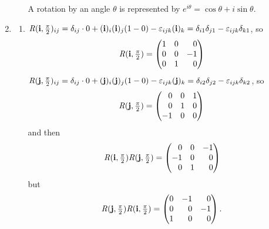 \documentclass[fleqn,a4paper,11pt]{article}
\begin{document}
\begin{enumerate}[label=\textbf{\arabic*.}]
\begin{enumerate}[label=(\alph*)]
      A rotation by an angle \(\theta\) is represented by
      \(e^{i\theta} = \cos \theta + i \sin \theta\).
    \end{enumerate}
   \item
    \begin{enumerate}[label=(\alph*)]
     \item
      \(\mathit{R}(\mathrm{\mathbf{i}}, \frac \pi 2)_{ij}
        = \delta_{ij} \cdot 0 + (\mathrm{\mathbf{i}})_i (\mathrm{\mathbf{i}})_j (1 - 0)
           - \varepsilon_{ijk} (\mathrm{\mathbf{i}})_k
        = \delta_{i1} \delta_{j1} - \varepsilon_{ijk} \delta_{k1}\), so
      \begin{equation*}
       \mat R(\vec i, \tfrac \pi 2)
        =
        \begin{pmatrix*}[r]
         1 & 0 & 0 \\
         0 & 0 & -1 \\
         0 & 1 & 0
        \end{pmatrix*}
      \end{equation*}
      \(\mathit{R}(\mathrm{\mathbf{j}}, \frac \pi 2)_{ij}
        = \delta_{ij} \cdot 0 + (\mathrm{\mathbf{j}})_i (\mathrm{\mathbf{j}})_j (1 - 0)
           - \varepsilon_{ijk} (\mathrm{\mathbf{j}})_k
        = \delta_{i2} \delta_{j2} - \varepsilon_{ijk} \delta_{k2}\), so
      \begin{equation*}
       \mat R(\vec j, \tfrac \pi 2)
        =
        \begin{pmatrix*}[r]
         0 & 0 & 1 \\
         0 & 1 & 0 \\
         -1 & 0 & 0
        \end{pmatrix*}
      \end{equation*}
      and then
      \begin{equation*}
       \mat R(\vec i, \tfrac \pi 2)\mat R(\vec j, \tfrac \pi 2)
        =
        \begin{pmatrix*}[r]
         0 & 0 & -1 \\
         -1 & 0 & 0 \\
         0 & 1 & 0
        \end{pmatrix*}
      \end{equation*}
      but
      \begin{equation*}
       \mat R(\vec j, \tfrac \pi 2)\mat R(\vec i, \tfrac \pi 2)
        =
        \begin{pmatrix*}[r]
         0 & -1 & 0 \\
         0 & 0 & -1 \\
         1 & 0 & 0
        \end{pmatrix*}.
      \end{equation*}

\end{enumerate}
\end{enumerate}
\end{document}
